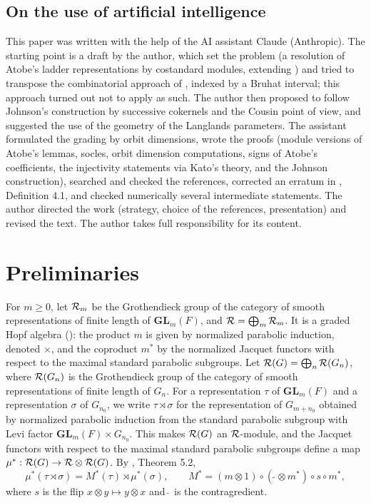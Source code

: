 \documentclass[a4paper,12pt,leqno]{amsart}
\theoremstyle{plain}
\theoremstyle{definition}
\begin{document}
\subsection*{On the use of artificial intelligence}
This paper was written with the help of the AI assistant Claude (Anthropic). The starting point is a
draft by the author, which set the problem (a resolution of Atobe's ladder representations by
costandard modules, extending \cite{Ren26}) and tried to transpose the combinatorial approach of
\cite{Ren26}, indexed by a Bruhat interval; this approach turned out not to apply as such. The author
then proposed to follow Johnson's construction by successive cokernels \cite{Joh84} and the Cousin
point of view, and suggested the use of the geometry of the Langlands parameters. The assistant
formulated the grading by orbit dimensions, wrote the proofs (module versions of Atobe's lemmas,
socles, orbit dimension computations, signs of Atobe's coefficients, the injectivity statements via
Kato's theory, and the Johnson construction), searched and checked the references, corrected an
erratum in \cite{Ato24}, Definition 4.1, and checked numerically several intermediate statements. The
author directed the work (strategy, choice of the references, presentation) and revised the text. The
author takes full responsibility for its content.

\section{Preliminaries}\label{sec:prelim}

For $m\geq0$, let $\mathcal{R}_m$ be the Grothendieck group of the category of smooth representations of
finite length of $\mathbf{GL}_m(F)$, and $\mathcal{R}=\bigoplus_m\mathcal{R}_m$. It is a graded Hopf algebra
(\cite{Zel80}): the product $m$ is given by normalized parabolic induction, denoted $\times$, and
the coproduct $m^*$ by the normalized Jacquet functors with respect to the maximal standard
parabolic subgroups. Let $\mathcal{R}(G)=\bigoplus_n\mathcal{R}(G_n)$, where $\mathcal{R}(G_n)$ is the Grothendieck
group of the category of smooth representations of finite length of $G_n$. For a representation
$\tau$ of $\mathbf{GL}_m(F)$ and a representation $\sigma$ of $G_{n_0}$, we write
$\tau\rtimes\sigma$ for the representation of $G_{m+n_0}$ obtained by normalized parabolic
induction from the standard parabolic subgroup with Levi factor $\mathbf{GL}_m(F)\times G_{n_0}$.
This makes $\mathcal{R}(G)$ an $\mathcal{R}$-module, and the Jacquet functors with respect to the maximal
standard parabolic subgroups define a map $\mu^*:\mathcal{R}(G)\rightarrow\mathcal{R}\otimes\mathcal{R}(G)$. By
\cite{Tad95b}, Theorem 5.2,
\[\mu^*(\tau\rtimes\sigma)=M^*(\tau)\rtimes\mu^*(\sigma),\qquad M^*=(m\otimes1)\circ(\widetilde{\ }\otimes m^*)\circ s\circ m^*,\]
where $s$ is the flip $x\otimes y\mapsto y\otimes x$ and $\widetilde{\ }$ is the contragredient.
\end{document}
